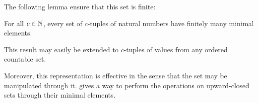 The following lemma ensure that this set is finite:
\begin{lemm}
  For all $c \in \mathbb{N}$, every set of $c$-tuples of natural numbers have finitely many minimal elements.
\end{lemm}
This result may easily be extended to $c$-tuples of values from any ordered countable set.

Moreover, this representation is effective in the sense that the set may be manipulated through it.
\cite{Ganty09} gives a way to perform the operations on upward-closed sets through their minimal elements.

%
%
%
%
%
%
%
%
%
